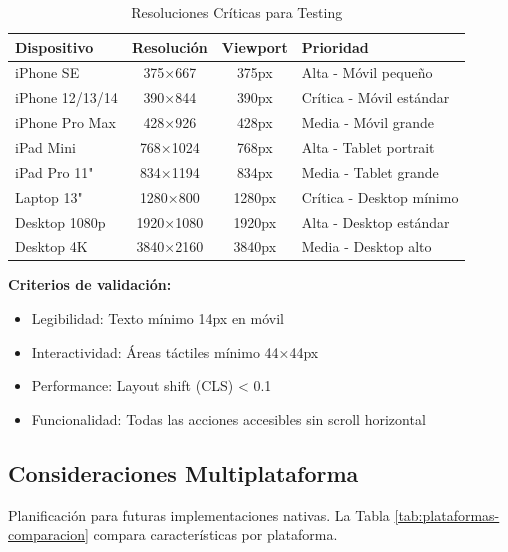 \documentclass[12pt,a4paper,oneside]{article}
\begin{document}
\begin{table}[h]
\centering
\caption{Resoluciones Críticas para Testing}
\label{tab:testing-resolutions}
\small
\begin{tabular}{|l|c|c|p{4cm}|}
\hline
\textbf{Dispositivo} & \textbf{Resolución} & \textbf{Viewport} & \textbf{Prioridad} \\
\hline
iPhone SE & 375×667 & 375px & Alta - Móvil pequeño \\
\hline
iPhone 12/13/14 & 390×844 & 390px & Crítica - Móvil estándar \\
\hline
iPhone Pro Max & 428×926 & 428px & Media - Móvil grande \\
\hline
iPad Mini & 768×1024 & 768px & Alta - Tablet portrait \\
\hline
iPad Pro 11" & 834×1194 & 834px & Media - Tablet grande \\
\hline
Laptop 13" & 1280×800 & 1280px & Crítica - Desktop mínimo \\
\hline
Desktop 1080p & 1920×1080 & 1920px & Alta - Desktop estándar \\
\hline
Desktop 4K & 3840×2160 & 3840px & Media - Desktop alto \\
\hline
\end{tabular}
\end{table}

\textbf{Criterios de validación:}
\begin{itemize}
    \item Legibilidad: Texto mínimo 14px en móvil
    \item Interactividad: Áreas táctiles mínimo 44×44px
    \item Performance: Layout shift (CLS) < 0.1
    \item Funcionalidad: Todas las acciones accesibles sin scroll horizontal
\end{itemize}

\newpage

\subsection{Consideraciones Multiplataforma}

Planificación para futuras implementaciones nativas. La Tabla \ref{tab:plataformas-comparacion} compara características por plataforma.
\end{document}
